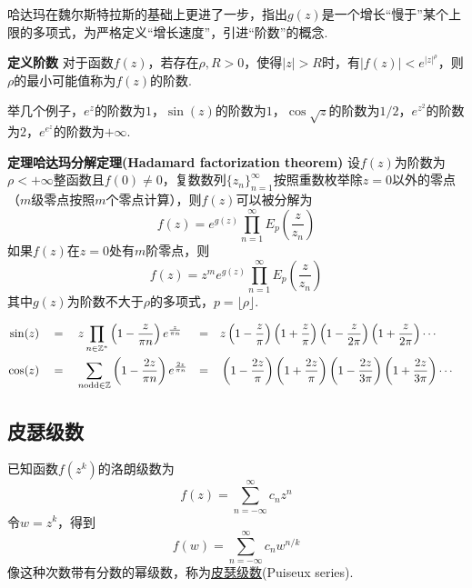 \documentclass[UTF8]{ctexart}
\newcommand{\trm}[1]{{\rm #1}}
\newenvironment{definition}[1]
    {\begin{tcolorbox}[enhanced, colback=LightYellow, breakable=false, frame hidden, borderline west={1.5mm}{-2mm}{DarkGreen}]
    {\bfseries {\color{DarkGreen} 定义}\quad #1} \newline}
    {\end{tcolorbox}}
\newenvironment{theorem}[1]
    {\begin{tcolorbox}[enhanced, colback=LightYellow, breakable=true, frame hidden, borderline west={1.5mm}{-2mm}{DarkBlue}]
    {\bfseries {\color{DarkBlue} 定理}\quad #1} \newline}
    {\end{tcolorbox}}
\begin{document}
哈达玛在魏尔斯特拉斯的基础上更进了一步，指出\(g(z)\)是一个增长“慢于”某个上限的多项式，为严格定义“增长速度”，引进“阶数”的概念.

\begin{definition}{阶数}
    对于函数\(f(z)\)，若存在\(\rho,R>0\)，使得\(|z|>R\)时，有\(|f(z)|<e^{|z|^{\rho}}\)，则\(\rho\)的最小可能值称为\(f(z)\)的阶数.
\end{definition}

举几个例子，\(e^z\)的阶数为\(1\)，\(\sin(z)\)的阶数为\(1\)，\(\cos\sqrt z\)的阶数为\(1/2\)，\(e^{z^2}\)的阶数为\(2\)，\(e^{e^z}\)的阶数为\(+\infty\).

\begin{theorem}{哈达玛分解定理(Hadamard factorization theorem)}
    设\(f(z)\)为阶数为\(\rho<+\infty\)整函数且\(f(0)\neq 0\)，复数数列\(\{z_n\}_{n=1}^{\infty}\)按照重数枚举除\(z=0\)以外的零点（\(m\)级零点按照\(m\)个零点计算），则\(f(z)\)可以被分解为
    \[f(z) = e^{g(z)}\prod_{n=1}^{\infty}E_{p}\left(\frac{z}{z_n}\right)\]
    如果\(f(z)\)在\(z=0\)处有\(m\)阶零点，则
    \[f(z) = z^me^{g(z)}\prod_{n=1}^{\infty}E_{p}\left(\frac{z}{z_n}\right)\]
    其中\(g(z)\)为阶数不大于\(\rho\)的多项式，\(p=\lfloor \rho \rfloor\).
\end{theorem}

\begin{align*}
    \sin(z) \quad&=\quad z\prod_{n \in \mathbb{Z}^*}\left(1-\frac{z}{\pi n}\right)e^{\frac{z}{\pi n}} &=&\quad z \left(1-\frac{z}{\pi}\right)\left(1+\frac{z}{\pi}\right)\left(1-\frac{z}{2\pi}\right)\left(1+\frac{z}{2\pi}\right)\cdots & \\
    \cos(z) \quad&=\quad \sum_{n \trm{odd} \in \mathbb{Z}}\left(1-\frac{2z}{\pi n}\right)e^{\frac{2z}{\pi n}} &=&\quad \left(1-\frac{2z}{\pi}\right)\left(1+\frac{2z}{\pi}\right)\left(1-\frac{2z}{3\pi}\right)\left(1+\frac{2z}{3\pi}\right)\cdots & \\
\end{align*}

\subsection{皮瑟级数}

已知函数\(f(z^k)\)的洛朗级数为
\[f(z) = \sum_{n=-\infty}^{\infty} c_nz^{n}\]
令\(w=z^k\)，得到
\[f(w) = \sum_{n=-\infty}^{\infty} c_nw^{n/k}\]
像这种次数带有分数的幂级数，称为\uline{皮瑟级数}(Puiseux series).
\end{document}
